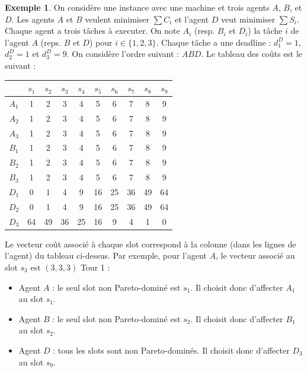 \documentclass[12pt]{article}
\theoremstyle{definition}
\newtheorem{exemple}{Exemple}
\begin{document}
\begin{exemple}
On considère une instance avec une machine et trois agents $A$, $B$, et $D$. Les agents $A$ et $B$ veulent minimiser $\sum C_i$ et l'agent $D$ veut minimiser $\sum S_i$. Chaque agent a trois tâches à executer. On note $A_i$ (resp. $B_i$ et $D_i$) la tâche $i$ de l'agent $A$ (reps. $B$ et $D$) pour $i\in \{1, 2, 3\}$. Chaque tâche a une deadline : $d_1^D = 1$, $d_2^D = 1$ et $d_3^D = 9$. On considère l'ordre suivant : $ABD$. 
Le tableau des coûts est le suivant :

\begin{table}[H]
    \begin{tabular}{|c||c|c|c|c|c||c|c|c|c|}
        \hline
        & $s_1$ & $s_2$ & $s_3$ & $s_4$ & $s_5$ & $s_6$ & $s_7$ & $s_8$ & $s_9$ \\
        \hline 
        $A_1$ & 1 & 2 & 3 & 4 & 5 & 6 & 7 & 8 & 9 \\
        $A_2$ & 1 & 2 & 3 & 4 & 5 & 6 & 7 & 8 & 9 \\
        $A_3$ & 1 & 2 & 3 & 4 & 5 & 6 & 7 & 8 & 9 \\
        \hline
        $B_1$ & 1 & 2 & 3 & 4 & 5 & 6 & 7 & 8 & 9 \\
        $B_2$ & 1 & 2 & 3 & 4 & 5 & 6 & 7 & 8 & 9 \\
        $B_3$ & 1 & 2 & 3 & 4 & 5 & 6 & 7 & 8 & 9 \\
        \hline
        $D_1$ & 0 & 1 & 4 & 9 & 16 & 25 & 36 & 49 & 64 \\
        $D_2$ & 0 & 1 & 4 & 9 & 16 & 25 & 36 & 49 & 64 \\
        $D_3$ & 64 & 49 & 36 & 25 & 16 & 9 & 4 & 1 & 0 \\
        \hline
    \end{tabular}
\end{table}
Le vecteur coût associé à chaque slot correspond à la colonne (dans les lignes de l'agent) du tableau ci-dessus. Par exemple, pour l'agent $A$, le vecteur associé au slot $s_3$ est $(3, 3, 3)$
Tour 1 : 
\begin{itemize}
\item Agent $A$ : le seul slot non Pareto-dominé est $s_1$. Il choisit donc d'affecter $A_1$ au slot $s_1$.
\item Agent $B$ : le seul slot non Pareto-dominé est $s_2$. Il choisit donc d'affecter $B_1$ au slot $s_2$.
\item Agent $D$ : tous les slots sont non Pareto-dominés. Il choisit donc d'affecter $D_3$ au slot $s_9$.
\end{itemize}

\end{exemple}
\end{document}
